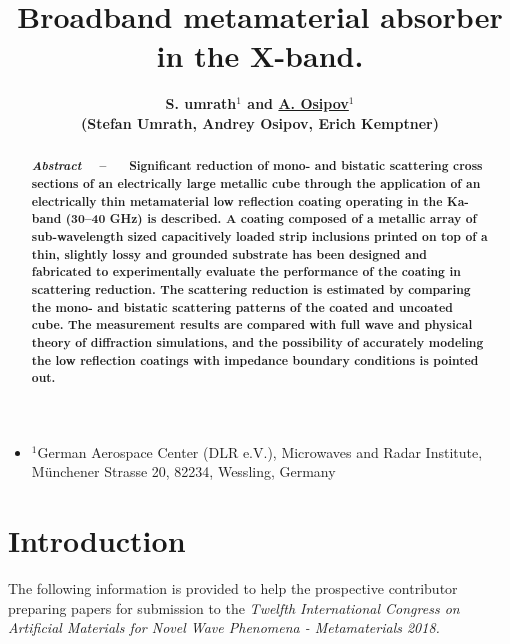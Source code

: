 \documentclass[10pt,a4paper]{article}
\begin{document}
\title{\large \textbf{Broadband metamaterial absorber in the X-band.}}
%
\def\affil#1{\begin{itemize} \item[] #1 \end{itemize}}
%
\author{\normalsize \bfseries S. umrath$^1$ and \underline{A. Osipov}$^1$
\\ \small (Stefan Umrath, Andrey Osipov, Erich Kemptner)}
%
\date{}
%
\maketitle
\thispagestyle{fancy} %
%
\vspace{-6ex}
\affil{\begin{center}\normalsize $^1$German Aerospace Center (DLR e.V.), Microwaves and Radar Institute, Münchener Strasse 20, 82234, Wessling, Germany
 \end{center}}


\begin{abstract}
\noindent \normalsize
\textbf{\textit{Abstract} \ \ -- \ \
Significant reduction of mono- and bistatic scattering cross
sections of an electrically large metallic cube through the application of
an electrically thin metamaterial low reflection coating operating in the
Ka-band (30--40 GHz) is described. A coating composed of a metallic array
of sub-wavelength sized capacitively loaded strip inclusions printed on top
of a thin, slightly lossy and grounded substrate has been designed and fabricated to experimentally evaluate the performance of the coating in scattering reduction. The scattering reduction is estimated by comparing the
mono- and bistatic scattering patterns of the coated and uncoated cube.
The measurement results are compared with full wave and physical theory
of diffraction simulations, and the possibility of accurately modeling the
low reflection coatings with impedance boundary conditions is pointed out.}
\end{abstract}


\section{Introduction}

The following information is provided to help the prospective contributor preparing papers for submission to the \emph{Twelfth International Congress on Artificial Materials for Novel Wave Phenomena - Metamaterials 2018.}
\end{document}
